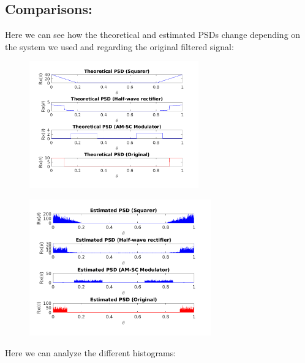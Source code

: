 \documentclass[a4paper,11pt]{article}
\begin{document}
\subsection{Comparisons:}

Here we can see how the theoretical and estimated PSDs change depending on the
system we used and regarding the original filtered signal:

\begin{figure}[!hp]
    \begin{center}
      \includegraphics[width=0.65\textwidth]{images/study3/comp_psd_th.png}
    \end{center}
\end{figure}

\newpage

\begin{figure}[!hp]
    \begin{center}
      \includegraphics[width=0.7\textwidth]{images/study3/comp_psd_es.png}
    \end{center}
\end{figure}

Here we can analyze the different histograms:
\end{document}
